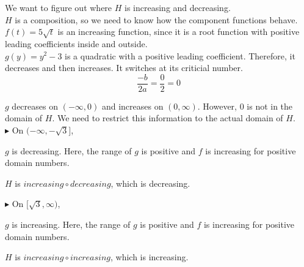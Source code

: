 \documentclass{ximera}
\begin{document}
We want to figure out where $H$ is increasing and decreasing. \\

$H$ is a composition, so we need to know how the component functions behave. \\





$f(t) = 5 \sqrt{t}$ is an increasing function, since it is a root function with positive leading coefficients inside and outside. \\

$g(y) = y^2 - 3$ is a quadratic with a positive leading coefficient.  Therefore, it decreases and then increases.   It switches at its criticial number.\\



\[
\frac{-b}{2 a} = \frac{0}{2} = 0
\]


$g$ decreases on $(-\infty, 0)$ and increases on $(0, \infty)$.  However, $0$ is not in the domain of $H$. We need to restrict this information to the actual domain of $H$. \\





\textbf{\textcolor{blue!55!black}{$\blacktriangleright$}} On $(-\infty, -\sqrt{3}]$, 


$g$ is decreasing. Here, the range of $g$ is positive and $f$ is increasing for positive domain numbers. \\ 



\begin{center}
$H$ is $increasing \circ decreasing$, which is decreasing. \\
\end{center}





\textbf{\textcolor{blue!55!black}{$\blacktriangleright$}} On $[\sqrt{3}, \infty)$, 


$g$ is increasing. Here, the range of $g$ is positive and $f$ is increasing for positive domain numbers. \\ 


\begin{center}
$H$ is $increasing \circ increasing$, which is increasing. \\
\end{center}
\end{document}
